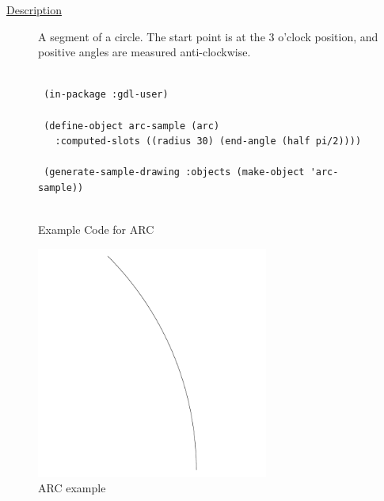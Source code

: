 \documentclass [11pt]{book}
\begin{document}
\begin{itemize}
\begin{description}
\item [
\underline{Description}]


A segment of a circle.
The start point is at the 3 o'clock position, and positive
angles are measured anti-clockwise.



\end{description}




\begin{figure}
\begin{lrbox}{\boxedverb}
\begin{minipage}{\linewidth}
{\small

\begin{verbatim}

 (in-package :gdl-user)

 (define-object arc-sample (arc) 
   :computed-slots ((radius 30) (end-angle (half pi/2))))

 (generate-sample-drawing :objects (make-object 'arc-sample))


\end{verbatim}}
\end{minipage}
\end{lrbox}
\fbox{\usebox{\boxedverb}}

\caption{Example Code for ARC}

\label{fig:example-code-ARC}

\end{figure}

\begin{figure}
\begin{center}
\includegraphics[width=3in,height=3in]{../images/example-ARC.pdf}
\end{center}

\caption{ARC example}


\end{figure}
\end{itemize}
\end{document}
